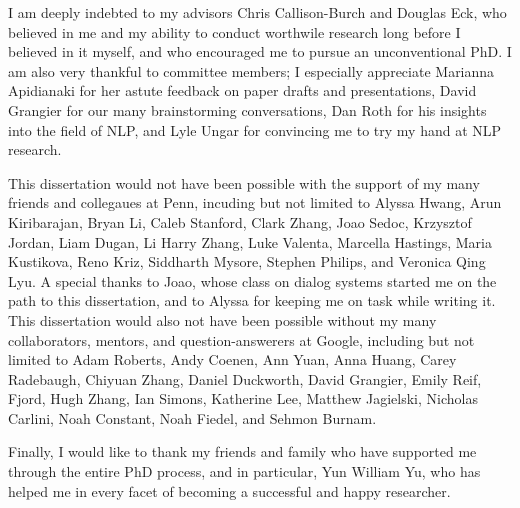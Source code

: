 
I am deeply indebted to my advisors Chris Callison-Burch and Douglas Eck, who believed in me and my ability to conduct worthwile research long before I believed in it myself, and who encouraged me to pursue an unconventional PhD.
I am also very thankful to committee members;
I especially appreciate Marianna Apidianaki for her astute feedback on paper drafts and presentations, David Grangier for our many brainstorming conversations,  Dan Roth for his insights into the field of NLP, and Lyle Ungar for convincing me to try my hand at NLP research.

This dissertation would not have been possible with the support of my many friends and collegaues at Penn, incuding but not limited to
Alyssa Hwang, 
Arun Kiribarajan,
Bryan Li, 
Caleb Stanford,
Clark Zhang,
Joao Sedoc, 
Krzysztof Jordan,
Liam Dugan,
Li Harry Zhang,
Luke Valenta,
Marcella Hastings,
Maria Kustikova, 
Reno Kriz, 
Siddharth Mysore,
Stephen Philips, and
Veronica Qing Lyu.
A special thanks to Joao, whose class on dialog systems started me on the path to this dissertation, and to Alyssa for keeping me on task while writing it.
This dissertation would also not have been possible without my many collaborators, mentors, and question-answerers at Google, including but not limited to
Adam Roberts, 
Andy Coenen,
Ann Yuan,
Anna Huang,
Carey Radebaugh,
Chiyuan Zhang,
Daniel Duckworth,
David Grangier,
Emily Reif,
Fjord,
Hugh Zhang,
Ian Simons,
Katherine Lee,
Matthew Jagielski,
Nicholas Carlini,
Noah Constant,
Noah Fiedel, and
Sehmon Burnam.

Finally, I would like to thank my friends and family who have supported me through the entire PhD process,
and in particular, Yun William Yu, who has helped me in every facet of becoming a successful and happy researcher.


